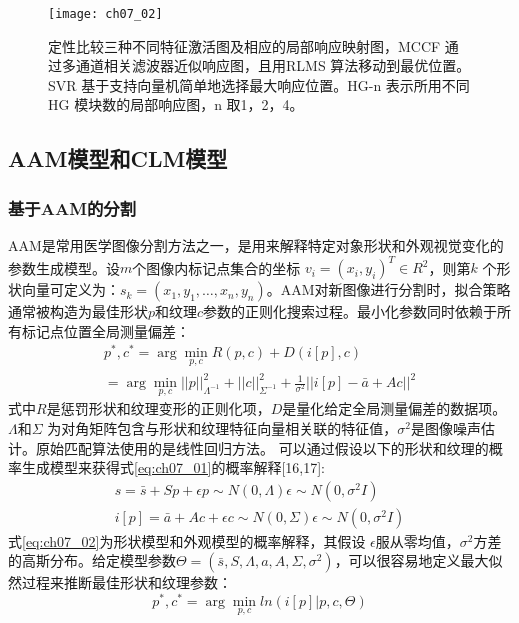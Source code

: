 \begin{figure}[!htbp]
    \centering
    \texttt{[image: ch07\_02]}
    \caption[定性比较三种不同特征激活图及相应的局部响应映射图]{定性比较三种不同特征激活图及相应的局部响应映射图，MCCF 通过多通道相关滤波器近似响应图，且用RLMS 算法移动到最优位置。SVR 基于支持向量机简单地选择最大响应位置。HG-n 表示所用不同HG 模块数的局部响应图，n 取1，2，4。}
    \label{fig:ch07_02}
    \end{figure}
\subsection{AAM模型和CLM模型} 
\subsubsection{基于AAM的分割} 
AAM是常用医学图像分割方法之一，是用来解释特定对象形状和外观视觉变化的参数生成模型。设$m$个图像内标记点集合的坐标 $v_i=(x_i,y_i)^T\in R^2$，则第$k$ 个形状向量可定义为：$s_k=(x_1,y_1,\dots,x_n,y_n)$。AAM对新图像进行分割时，拟合策略通常被构造为最佳形状$p$和纹理$c$参数的正则化搜索过程。最小化参数同时依赖于所有标记点位置全局测量偏差：
\begin{equation}\label{eq:ch07_01}
    \begin{aligned}
 p^*,c^*=\arg \min_{p,c}{R(p,c)+D(i[p],c)}\\
 =\arg \min_{p,c}{||p||_{ \Lambda^{-1}}^2+||c||_{ \Sigma^{-1}}^2+ \frac{1}{\sigma^2}||i[p]-\bar{a}+Ac||^2}   
    \end{aligned}
\end{equation}
式中$R$是惩罚形状和纹理变形的正则化项，$D$是量化给定全局测量偏差的数据项。$\Lambda$和$\Sigma$ 为对角矩阵包含与形状和纹理特征向量相关联的特征值，$\sigma^2$是图像噪声估计。原始匹配算法使用的是线性回归方法。
可以通过假设以下的形状和纹理的概率生成模型来获得式\ref{eq:ch07_01}的概率解释[16,17]:  
\begin{equation}\label{eq:ch07_02}
    \begin{aligned}
    s= \bar{s}+Sp+\epsilon    p \sim N(0,\Lambda)   \epsilon \sim N(0,\sigma^2I)\\
    i[p]=\bar{a}+Ac+\epsilon     c \sim N(0,\Sigma)    \epsilon \sim N(0,\sigma^2I)
    \end{aligned}
\end{equation}
式\ref{eq:ch07_02}为形状模型和外观模型的概率解释，其假设 $\epsilon$服从零均值，$\sigma^2$方差的高斯分布。给定模型参数$\Theta=(\bar{s},S,\Lambda,a,A,\Sigma,\sigma^2)$，可以很容易地定义最大似然过程来推断最佳形状和纹理参数：
\begin{equation}\label{eq:ch07_03}
    p^*,c^*=\arg \min_{p,c}{ ln(i[p]|p,c,\Theta)}
\end{equation}   

